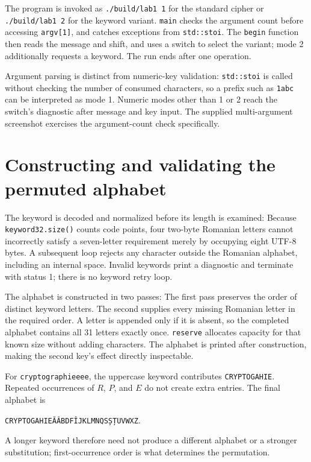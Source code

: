 \documentclass{utmreport}
\newcommand{\sourceexcerpt}[2]{\VerbatimInput[firstline=#1,lastline=#2]{../src/main.cpp}}
\begin{document}
The program is invoked as \texttt{./build/lab1 1} for the standard cipher or \texttt{./build/lab1 2} for the keyword variant. \texttt{main} checks the argument count before accessing \texttt{argv[1]}, and catches exceptions from \texttt{std::stoi}. The \texttt{begin} function then reads the message and shift, and uses a switch to select the variant; mode 2 additionally requests a keyword. The run ends after one operation.

Argument parsing is distinct from numeric-key validation: \texttt{std::stoi} is called without checking the number of consumed characters, so a prefix such as \texttt{1abc} can be interpreted as mode 1. Numeric modes other than 1 or 2 reach the switch's diagnostic after message and key input. The supplied multi-argument screenshot exercises the argument-count check specifically.

\section{Constructing and validating the permuted alphabet}
The keyword is decoded and normalized before its length is examined:
\sourceexcerpt{335}{344}
Because \texttt{keyword32.size()} counts code points, four two-byte Romanian letters cannot incorrectly satisfy a seven-letter requirement merely by occupying eight UTF-8 bytes. A subsequent loop rejects any character outside the Romanian alphabet, including an internal space. Invalid keywords print a diagnostic and terminate with status 1; there is no keyword retry loop.

The alphabet is constructed in two passes:
\sourceexcerpt{361}{376}
The first pass preserves the order of distinct keyword letters. The second supplies every missing Romanian letter in the required order. A letter is appended only if it is absent, so the completed alphabet contains all 31 letters exactly once. \texttt{reserve} allocates capacity for that known size without adding characters. The alphabet is printed after construction, making the second key's effect directly inspectable.

For \texttt{cryptographieeee}, the uppercase keyword contributes \texttt{CRYPTOGAHIE}. Repeated occurrences of $R$, $P$, and $E$ do not create extra entries. The final alphabet is
\begin{center}\texttt{CRYPTOGAHIEĂÂBDFÎJKLMNQSȘȚUVWXZ}.\end{center}
A longer keyword therefore need not produce a different alphabet or a stronger substitution; first-occurrence order is what determines the permutation.
\end{document}

